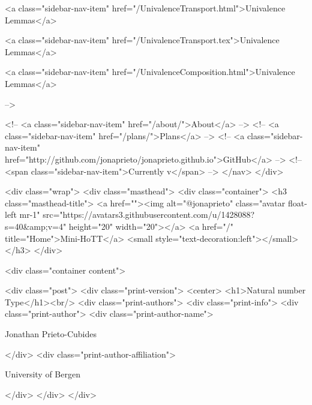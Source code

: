       
    
      
        
          <a class="sidebar-nav-item" href="/UnivalenceTransport.html">Univalence Lemmas</a>
        
      
    
      
        
          <a class="sidebar-nav-item" href="/UnivalenceTransport.tex">Univalence Lemmas</a>
        
      
    
      
        
          <a class="sidebar-nav-item" href="/UnivalenceComposition.html">Univalence Lemmas</a>
        
      
     -->

    <!-- <a class="sidebar-nav-item" href="/about/">About</a> -->
    <!-- <a class="sidebar-nav-item" href="/plans/">Plans</a> -->
    <!-- <a class="sidebar-nav-item" href="http://github.com/jonaprieto/jonaprieto.github.io">GitHub</a> -->
    <!-- <span class="sidebar-nav-item">Currently v</span> -->
  </nav>
</div>

    <div class="wrap">
      <div class="masthead">
        <div class="container">
          <h3 class="masthead-title">
            <a href=""><img alt="@jonaprieto" class="avatar float-left mr-1" src="https://avatars3.githubusercontent.com/u/1428088?s=40&amp;v=4" height="20" width="20"></a>
            <a href="/" title="Home">Mini-HoTT</a>
            <small style="text-decoration:left"></small>
          </h3>
        </div>
      
      <div class="container content">
        







<div class="post">
  <div class="print-version">
    <center>
      <h1>Natural number Type</h1><br/>
        <div class="print-authors">
          <div class="print-info">
            <div class="print-author">
              <div class="print-author-name">
                
                  Jonathan Prieto-Cubides
                
              </div>
              <div class="print-author-affiliation">
                
                  University of Bergen
                
                </div>
            </div>
          </div>
          
